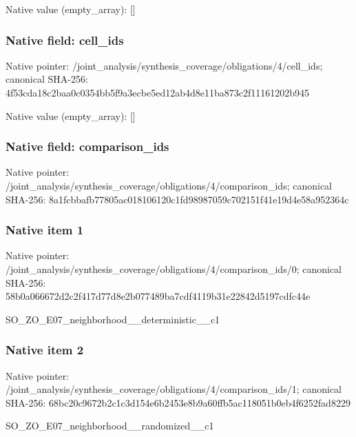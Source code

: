 \documentclass[10pt,a4paper]{article}
\begin{document}
Native value (empty\_\allowbreak{}array): []

\subsubsection{Native field: cell\_\allowbreak{}ids}
Native pointer: /joint\_\allowbreak{}analysis/synthesis\_\allowbreak{}coverage/obligations/4/cell\_\allowbreak{}ids; canonical SHA-256: 4f53cda18c2baa0c0354bb5f9a3ecbe5ed12ab4d8e11ba873c2f11161202b945

Native value (empty\_\allowbreak{}array): []

\subsubsection{Native field: comparison\_\allowbreak{}ids}
Native pointer: /joint\_\allowbreak{}analysis/synthesis\_\allowbreak{}coverage/obligations/4/comparison\_\allowbreak{}ids; canonical SHA-256: 8a1fcbbafb77805ac018106120c1fd98987059c702151f41e19d4e58a952364c

\subsubsection{Native item 1}
Native pointer: /joint\_\allowbreak{}analysis/synthesis\_\allowbreak{}coverage/obligations/4/comparison\_\allowbreak{}ids/0; canonical SHA-256: 58b0a066672d2c2f417d77d8e2b077489ba7cdf4119b31e22842d5197cdfc44e

\begingroup\raggedright\sloppy SO\_\allowbreak{}ZO\_\allowbreak{}E07\_\allowbreak{}neighborhood\_\allowbreak{}\_\allowbreak{}deterministic\_\allowbreak{}\_\allowbreak{}c1\par\endgroup

\subsubsection{Native item 2}
Native pointer: /joint\_\allowbreak{}analysis/synthesis\_\allowbreak{}coverage/obligations/4/comparison\_\allowbreak{}ids/1; canonical SHA-256: 68bc20c9672b2c1c3d154e6b2453e8b9a60ffb5ac118051b0eb4f6252fad8229

\begingroup\raggedright\sloppy SO\_\allowbreak{}ZO\_\allowbreak{}E07\_\allowbreak{}neighborhood\_\allowbreak{}\_\allowbreak{}randomized\_\allowbreak{}\_\allowbreak{}c1\par\endgroup
\end{document}
